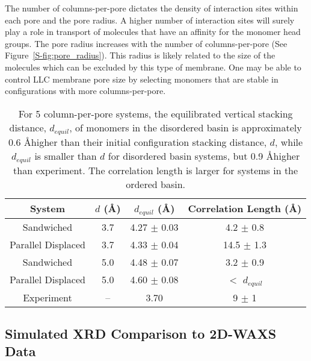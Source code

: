   \label{addition:pore_radius}
  The number of columns-per-pore dictates the density of interaction sites within
  each pore and the pore radius. A higher number of interaction sites will 
  surely play a role in transport of molecules that have an affinity for the monomer
  head groups. The pore radius increases with the number of 
  columns-per-pore (See Figure~\ref{S-fig:pore_radius}). This radius is likely 
  related to the size of the molecules which can be excluded by this type of 
  membrane. One may be able to control LLC membrane pore size by selecting monomers
  that are stable in configurations with more columns-per-pore.
  
  \begin{table}[h]
  \centering
  \begin{tabular}{cccc}
  \hline
  System             & $\mathit{d}$ (\AA) & $\mathit{d}_{equil}$ (\AA) & Correlation Length (\AA) \\
  \hline
  Sandwiched         & 3.7                &    4.27 $\pm$ 0.03         & 4.2 $\pm$ 0.8            \\
  Parallel Displaced & 3.7                &    4.33 $\pm$ 0.04         & 14.5 $\pm$ 1.3           \\ 
  Sandwiched         & 5.0                &    4.48 $\pm$ 0.07         & 3.2 $\pm$ 0.9            \\
  Parallel Displaced & 5.0                &    4.60 $\pm$ 0.08         & $<$ $d_{equil}$ \\ 
  Experiment         & --                 &    3.70                    & 9 $\pm$ 1               \\
  \hline
  \end{tabular}
  \caption{For 5 column-per-pore systems, the equilibrated vertical stacking distance, 
  $\mathit{d}_{equil}$, of monomers in the disordered basin is approximately 0.6 \AA higher than
  their initial configuration stacking distance, $\mathit{d}$, while $\mathit{d}_{equil}$ is 
  smaller than $\mathit{d}$ for disordered basin systems, but 0.9 \AA higher than experiment. 
  The correlation length is larger for systems in the ordered basin.}
  \label{table:correlation_length}
  \end{table}

  \subsection{Simulated XRD Comparison to 2D-WAXS Data}

